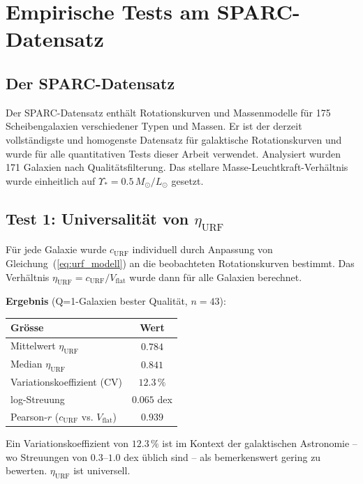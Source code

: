 \documentclass[12pt,a4paper]{article}
\theoremstyle{definition}
\begin{document}
\section{Empirische Tests am SPARC-Datensatz}
\label{sec:sparc}

\subsection{Der SPARC-Datensatz}

Der SPARC-Datensatz \cite{Lelli2016} enthält Rotationskurven und
Massenmodelle für 175 Scheibengalaxien verschiedener Typen und Massen.
Er ist der derzeit vollständigste und homogenste Datensatz für galaktische
Rotationskurven und wurde für alle quantitativen Tests dieser Arbeit
verwendet. Analysiert wurden 171 Galaxien nach Qualitätsfilterung.
Das stellare Masse-Leuchtkraft-Verhältnis wurde einheitlich auf
$\Upsilon_* = 0.5\,M_\odot/L_\odot$ gesetzt.

\subsection{Test 1: Universalität von $\eta_{\mathrm{URF}}$}

Für jede Galaxie wurde $c_{\mathrm{URF}}$ individuell durch Anpassung von
Gleichung~(\ref{eq:urf_modell}) an die beobachteten Rotationskurven bestimmt.
Das Verhältnis $\eta_{\mathrm{URF}} = c_{\mathrm{URF}}/V_{\mathrm{flat}}$ wurde dann für
alle Galaxien berechnet.

\textbf{Ergebnis} (Q=1-Galaxien bester Qualität, $n = 43$):
\begin{center}
\begin{tabular}{lc}
\toprule
Grösse & Wert \\
\midrule
Mittelwert $\eta_{\mathrm{URF}}$ & $0.784$ \\
Median $\eta_{\mathrm{URF}}$ & $0.841$ \\
Variationskoeffizient (CV) & $12.3\,\%$ \\
log-Streuung & $0.065$ dex \\
Pearson-$r$ ($c_{\mathrm{URF}}$ vs. $V_{\mathrm{flat}}$) & $0.939$ \\
\bottomrule
\end{tabular}
\end{center}

Ein Variationskoeffizient von $12.3\,\%$ ist im Kontext der galaktischen
Astronomie -- wo Streuungen von $0.3$--$1.0$ dex üblich sind -- als
bemerkenswert gering zu bewerten. $\eta_{\mathrm{URF}}$ ist universell.
\end{document}
